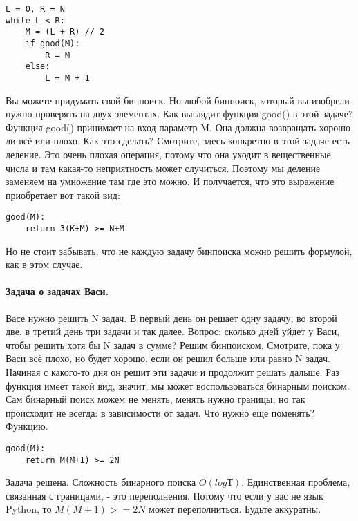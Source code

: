 \documentclass[a4paper,12pt]{article}
\begin{document}
\begin{verbatim}
L = 0, R = N
while L < R:
    M = (L + R) // 2
    if good(M):
        R = M
    else:
        L = M + 1
\end{verbatim}
Вы можете придумать свой бинпоиск. Но любой бинпоиск, который вы изобрели нужно проверять на двух элементах. Как выглядит функция good() в этой задаче? Функция good() принимает на вход параметр M. 
Она должна возвращать хорошо ли всё или плохо. Как это сделать? Смотрите, здесь конкретно в этой задаче есть деление. Это очень плохая операция, потому что она уходит в вещественные числа и там какая-то неприятность может случиться. Поэтому мы деление заменяем на умножение там где это можно. И получается, что это выражение приобретает вот такой вид:
\begin{verbatim}
good(M):
    return 3(K+M) >= N+M
\end{verbatim}
Но не стоит забывать, что не каждую задачу бинпоиска можно решить формулой, как в этом случае. 
\paragraph{Задача о задачах Васи.}
Васе нужно решить N задач. В первый день он решает одну задачу, во второй две, в третий день три задачи и так далее. Вопрос: сколько дней уйдет у Васи, чтобы решить хотя бы N задач в сумме? Решим бинпоиском. Смотрите, пока у Васи всё плохо, но будет хорошо, если он решил больше или равно N задач. Начиная с какого-то дня он решит эти задачи и продолжит решать дальше. Раз функция имеет такой вид, значит, мы может воспользоваться бинарным поиском. Сам бинарный поиск можем не менять, менять нужно границы, но так происходит не всегда: в зависимости от задач. Что нужно еще поменять? Функцию. 
\begin{verbatim}
good(M):
    return M(M+1) >= 2N
\end{verbatim}
Задача решена. Сложность бинарного поиска $O(logТ)$. Единственная проблема, связанная с границами, - это переполнения. Потому что если у вас не язык Python, то $M(M+1) >= 2N$ может переполниться. Будьте аккуратны.
\end{document}
